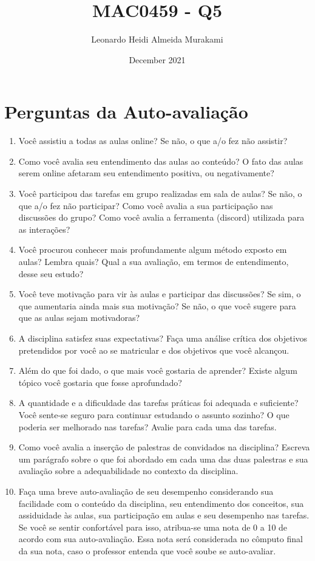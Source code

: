 \documentclass{article}
\title{MAC0459 - Q5}
\author{Leonardo  Heidi Almeida Murakami}
\date{December 2021}
\begin{document}
\maketitle

\section{Perguntas da Auto-avaliação}
\begin{enumerate}
\item Você assistiu a todas as aulas online? Se não, o que a/o fez não assistir?
\item Como você avalia seu entendimento das aulas ao conteúdo? O fato das aulas serem online afetaram seu entendimento positiva, ou negativamente?
\item Você participou das tarefas em grupo realizadas em sala de aulas?  Se não, o que a/o fez não participar? Como você avalia a sua participação nas discussões do grupo? Como você avalia a ferramenta (discord) utilizada para as interações?
\item Você procurou conhecer mais profundamente algum método exposto em aulas? Lembra quais? 
Qual a sua avaliação, em termos de entendimento, desse seu estudo?
\item Você teve motivação para vir às aulas e participar das discussões? Se sim, o que aumentaria 
ainda mais sua motivação? Se não, o que você sugere para que as aulas sejam motivadoras?
\item A disciplina satisfez suas expectativas? Faça uma análise crítica dos objetivos
  pretendidos por você ao se matricular e dos objetivos que você alcançou. 
\item Além do que foi dado, o que mais você gostaria de aprender? Existe algum tópico você gostaria 
que fosse aprofundado?
\item A quantidade e a dificuldade das tarefas práticas foi adequada e suficiente? Você
  sente-se seguro para continuar estudando o assunto sozinho? O que poderia ser melhorado nas 
tarefas? Avalie para cada uma das tarefas.
\item Como você avalia a inserção de palestras de convidados na disciplina? Escreva um parágrafo sobre o que foi abordado em cada uma das duas palestras e sua avaliação sobre a adequabilidade no contexto da disciplina.
\item Faça uma breve auto-avaliação de seu desempenho considerando sua 
         facilidade com o conteúdo da disciplina, seu entendimento dos 
         conceitos, sua assiduidade às aulas, sua
         participação em aulas e seu desempenho nas tarefas. Se você se
         sentir confortável para isso, atribua-se uma nota de 0 a 10
         de acordo com sua auto-avaliação. Essa nota será considerada
         no cômputo final da sua nota, caso o professor entenda que
         você soube se auto-avaliar.


\end{enumerate}
\end{document}
